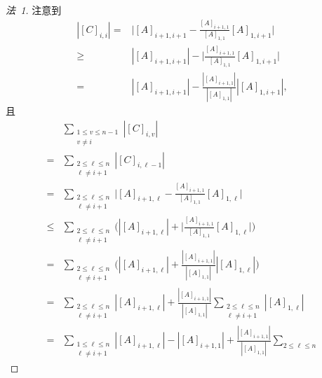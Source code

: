 \begin{proof}[法~1]
    注意到
    \begin{align*}
        |[C]_{i,i}|
        = {}    &
        \Bigg|
        [A]_{i+1,i+1} - \frac{[A]_{i+1,1}}{[A]_{1,1}} [A]_{1,i+1}
        \Bigg|
        \\
        \geq {} &
        |[A]_{i+1,i+1}| -
        \Bigg|
        \frac{[A]_{i+1,1}}{[A]_{1,1}} [A]_{1,i+1}
        \Bigg|
        \\
        = {}    &
        |[A]_{i+1,i+1}| -
        \frac{|[A]_{i+1,1}|}{|[A]_{1,1}|} |[A]_{1,i+1}|,
    \end{align*}
    且
    \begin{align*}
                &
        \sum_{\substack{1 \leq v \leq n-1  \\ v \neq i}}
        {|[C]_{i,v}|}
        \\
        = {}    &
        \sum_{\substack{2 \leq \ell \leq n \\ \ell \neq i+1}}
        {|[C]_{i,\ell-1}|}
        \\
        = {}    &
        \sum_{\substack{2 \leq \ell \leq n \\ \ell \neq i+1}}
        {\Bigg|
        [A]_{i+1,\ell} - \frac{[A]_{i+1,1}}{[A]_{1,1}} [A]_{1,\ell}
        \Bigg|}
        \\
        \leq {} &
        \sum_{\substack{2 \leq \ell \leq n \\ \ell \neq i+1}}
        {\Bigg(
            |[A]_{i+1,\ell}| +
            \Bigg|
            \frac{[A]_{i+1,1}}{[A]_{1,1}} [A]_{1,\ell}
            \Bigg|
            \Bigg)}
        \\
        = {}    &
        \sum_{\substack{2 \leq \ell \leq n \\ \ell \neq i+1}}
        {\Bigg(
            |[A]_{i+1,\ell}| +
            \frac{|[A]_{i+1,1}|}{|[A]_{1,1}|} |[A]_{1,\ell}|
            \Bigg)}
        \\
        = {}    &
        \sum_{\substack{2 \leq \ell \leq n \\ \ell \neq i+1}}
        {
        |[A]_{i+1,\ell}|
        }
        +
        \frac{|[A]_{i+1,1}|}{|[A]_{1,1}|}
        \sum_{\substack{2 \leq \ell \leq n \\ \ell \neq i+1}}
        {
        |[A]_{1,\ell}|
        }
        \\
        = {}    &
        \sum_{\substack{1 \leq \ell \leq n \\ \ell \neq i+1}}
        {
        |[A]_{i+1,\ell}|
        }
        - |[A]_{i+1,1}|
        +
        \frac{|[A]_{i+1,1}|}{|[A]_{1,1}|}
        \sum_{2 \leq \ell \leq n}

\end{align*}
\end{proof}
